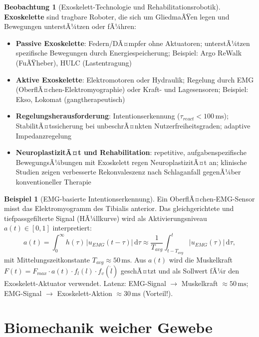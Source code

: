 ﻿\documentclass[a4paper,12pt]{report}
\theoremstyle{definition}
\newtheorem{beispiel}{Beispiel}
\newtheorem{beobachtung}{Beobachtung}
\begin{document}
\begin{beobachtung}[Exoskelett-Technologie und Rehabilitationsrobotik]
\textbf{Exoskelette} sind tragbare Roboter, die sich um GliedmaÃŸen legen
und Bewegungen unterstÃ¼tzen oder fÃ¼hren:
\begin{itemize}
    \item[-] \textbf{Passive Exoskelette}: Federn/DÃ¤mpfer ohne Aktuatoren;
          unterstÃ¼tzen spezifische Bewegungen durch Energiespeicherung;
          Beispiel: Argo ReWalk (FuÃŸheber), HULC (Lastentragung)
    \item[-] \textbf{Aktive Exoskelette}: Elektromotoren oder Hydraulik;
          Regelung durch EMG (OberflÃ¤chen-Elektromyographie) oder Kraft-
          und Lagesensoren; Beispiel: Ekso, Lokomat (gangtherapeutisch)
    \item[-] \textbf{Regelungsherausforderung}: Intentionserkennung
          ($\tau_{react} < 100\,\mathrm{ms}$); StabilitÃ¤tssicherung bei
          unbeschrÃ¤nkten Nutzerfreiheitsgraden; adaptive Impedanzregelung
    \item[-] \textbf{NeuroplastizitÃ¤t und Rehabilitation}: repetitive,
          aufgabenspezifische BewegungsÃ¼bungen mit Exoskelett regen
          NeuroplastizitÃ¤t an; klinische Studien zeigen verbesserte Rekonvaleszenz
          nach Schlaganfall gegenÃ¼ber konventioneller Therapie
\end{itemize}
\end{beobachtung}

\begin{beispiel}[EMG-basierte Intentionserkennung]
Ein OberflÃ¤chen-EMG-Sensor misst das Elektromyogramm des Tibialis anterior.
Das gleichgerichtete und tiefpassgefilterte Signal (HÃ¼llkurve) wird als
Aktivierungsniveau $a(t) \in [0,1]$ interpretiert:
\[
  a(t) = \int_0^\infty h(\tau)\,|u_{EMG}(t-\tau)|\,\mathrm{d}\tau
  \approx \frac{1}{T_{avg}}\int_{t-T_{avg}}^t |u_{EMG}(\tau)|\,\mathrm{d}\tau,
\]
mit Mittelungszeitkonstante $T_{avg} \approx 50\,\mathrm{ms}$.
Aus $a(t)$ wird die Muskelkraft $F(t) = F_{max}\cdot a(t)\cdot f_l(l)\cdot f_v(\dot{l})$
geschÃ¤tzt und als Sollwert fÃ¼r den Exoskelett-Aktuator verwendet.
Latenz: EMG-Signal $\to$ Muskelkraft $\approx 50\,\mathrm{ms}$;
EMG-Signal $\to$ Exoskelett-Aktion $\approx 30\,\mathrm{ms}$ (Vorteil!).
\end{beispiel}

\section{Biomechanik weicher Gewebe}
\end{document}
